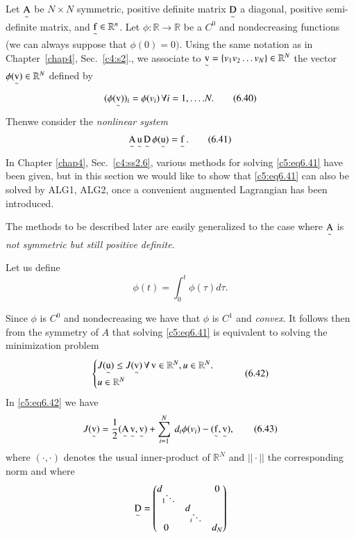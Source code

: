 Let $\operatorname*{A}\limits_\sim$ be $N\times N$  symmetric, positive definite 
matrix $\operatorname*{D}\limits_\sim$ a diagonal,  positive semi-definite matrix, and 
$\operatorname*{f}\limits_\sim \in \mathbb{R}^n$. Let $\phi : \mathbb{R}\to 
\mathbb{R}$ be a $C^0$ and nondecreasing functions (we can always  
suppose that $\phi (0) = 0)$.  Using the same notation as in 
Chapter~\ref{chap4},  Sec.~\ref{c4:s2}.,  we associate to 
$\operatorname*{v}\limits_\sim = \{v_1v_2\dots v_N \}  
 \in \mathbb{R}^N$ the vector $\phi (\operatorname*{v}\limits_\sim) \in 
 \mathbb{R}^N$ defined by        
\begin{equation}
(\phi (\operatorname*{v}\limits_\sim ))_i = \phi (v_i)\, \forall i = 1, \ldots. N. 
\tag{6.40}\label{c5:eq6.40} 
\end{equation}
Then\pageoriginale   we consider the \textit{nonlinear system}
\begin{equation}
\operatorname*{A}\limits_\sim \operatorname*{u} \limits_\sim \operatorname*{D}\limits_\sim \phi (\operatorname*{u}\limits_\sim ) 
= \operatorname*{f}\limits_\sim. \tag{6.41}\label{c5:eq6.41} 
\end{equation}
In Chapter \ref{chap4},  Sec.~\ref{c4:ss2.6}, various methods for 
solving \eqref{c5:eq6.41} have been given,  but in this section we 
would  like to show that \eqref{c5:eq6.41} can also be solved by ALG1,  
ALG2,  once a convenient augmented Lagrangian has been introduced.    

\begin{remark}\label{c5:rem6.3}%
The methods to be described later are easily generalized to the case 
where $\operatorname*{A} \limits_\sim$ is {\em not symmetric but still positive definite.} 

Let us define
$$
\phi (t) = \int^t_0 \phi (\tau ) d \tau. 
$$
\end{remark}
Since $\phi$ is $C^0$ and nondecreasing we have that $\phi $ is $C^1$ 
and \textit{convex}. It follows then from the symmetry of $A$ that 
solving \eqref{c5:eq6.41} is equivalent to solving the minimization 
problem   
\begin{equation}
\begin{cases}
J(\operatorname*{u}\limits_\sim ) \leq J (\operatorname*{v}\limits_\sim )\, \forall \operatorname*{v} \in \mathbb{R}^N, 
u \in \mathbb{R}^N.\\
  u \in \mathbb{R}^N
\end{cases} \tag{6.42}\label{c5:eq6.42}
\end{equation}
In \eqref{c5:eq6.42} we have 
\begin{equation}
J(\operatorname*{v}\limits_\sim) = \frac{1}{2} ({\operatorname*{A}\limits_\sim} \operatorname*{v}\limits_\sim, \operatorname*{v}\limits_\sim) 
+ \sum^N_{i=1} ~ d_i \phi (v_i) - (\operatorname*{f}\limits_\sim, \operatorname*{v}\limits_\sim ), 
\tag{6.43}\label{c5:eq6.43}  
\end{equation}
where $(\cdot , \cdot)$ denotes the usual inner-product of 
$\mathbb{R}^N$ and $|| \cdot ||$ the corresponding norm and where  
$$
\operatorname*{D}\limits_\sim= 
\begin{pmatrix}
d_{1 \ddots} & &0\\
 & d_{i\ddots} &\\
0 & &d_N
\end{pmatrix}
$$

